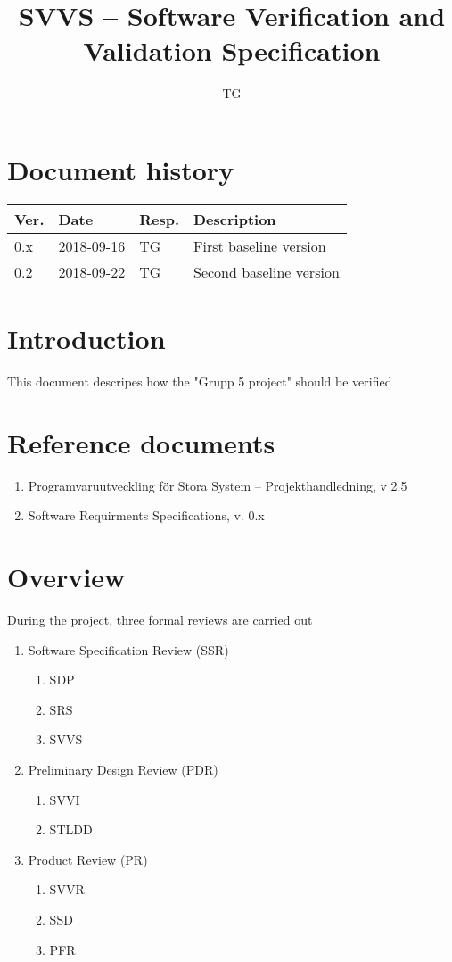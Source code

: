 \documentclass{article}
\title{SVVS – Software Verification and Validation Specification}
\begin{document}
\author{TG}

\maketitle
\thispagestyle{fancy}
\tableofcontents
\newpage
\section*{Document history}
\begin{tabular}{ l l l l}
  Ver. & Date & Resp. & Description \\
  \hline
  0.x & 2018-09-16 & TG & First baseline version \\
  0.2 & 2018-09-22 & TG & Second baseline version \\
\end{tabular}
\section{Introduction}
This document descripes how the "Grupp 5 project" should be verified
\section{Reference documents}
\begin{enumerate}
    \item Programvaruutveckling för Stora System – Projekthandledning, v 2.5
    \item Software Requirments Specifications, v. 0.x
\end{enumerate}
\section{Overview}
During the project, three formal reviews are carried out
\begin{enumerate}
    \item Software Specification Review (SSR)
    \begin{enumerate}[label=\alph*]
        \item SDP
        \item SRS
        \item SVVS
    \end{enumerate}
    \item Preliminary Design Review (PDR)
    \begin{enumerate}[label=\alph*]
        \item SVVI
        \item STLDD
    \end{enumerate}
    \item Product Review (PR)
    \begin{enumerate}[label=\alph*]
        \item SVVR
        \item SSD
        \item PFR
    \end{enumerate}
\end{enumerate}
\end{document}
